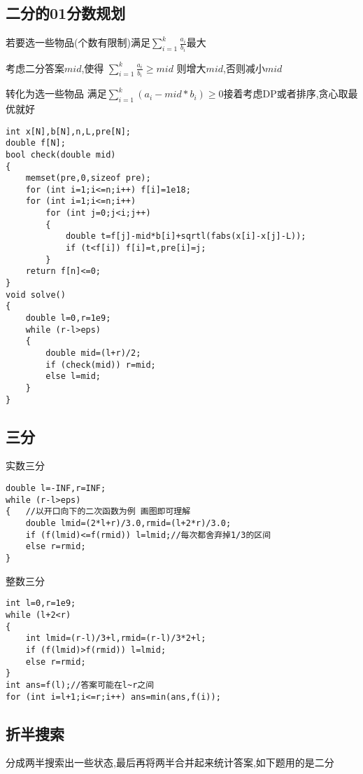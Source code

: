 \documentclass[a4paper]{ctexart}
\begin{document}
\subsection{二分的01分数规划}

若要选一些物品(个数有限制)满足$\sum\limits_{i=1}^k\frac{a_i}{b_i}$最大

考虑二分答案$mid$,使得 $\sum\limits_{i=1}^k\frac{a_i}{b_i}\ge mid$ 则增大$mid$,否则减小$mid$

转化为选一些物品 满足$\sum\limits_{i=1}^k(a_i-mid*b_i)\ge0$接着考虑DP或者排序,贪心取最优就好

\begin{lstlisting}
int x[N],b[N],n,L,pre[N];
double f[N];
bool check(double mid)
{
    memset(pre,0,sizeof pre);
    for (int i=1;i<=n;i++) f[i]=1e18;
    for (int i=1;i<=n;i++)
        for (int j=0;j<i;j++)
        {
            double t=f[j]-mid*b[i]+sqrtl(fabs(x[i]-x[j]-L));
            if (t<f[i]) f[i]=t,pre[i]=j;
        }
    return f[n]<=0;
}
void solve()
{
    double l=0,r=1e9;
    while (r-l>eps)
    {
        double mid=(l+r)/2;
        if (check(mid)) r=mid;
        else l=mid;
    }
}
\end{lstlisting}

\subsection{三分}

实数三分

\begin{lstlisting}
double l=-INF,r=INF;
while (r-l>eps)
{   //以开口向下的二次函数为例 画图即可理解
    double lmid=(2*l+r)/3.0,rmid=(l+2*r)/3.0;
    if (f(lmid)<=f(rmid)) l=lmid;//每次都舍弃掉1/3的区间
    else r=rmid;
}
\end{lstlisting}

整数三分

\begin{lstlisting}
int l=0,r=1e9;
while (l+2<r)
{
    int lmid=(r-l)/3+l,rmid=(r-l)/3*2+l;
    if (f(lmid)>f(rmid)) l=lmid;
    else r=rmid;
}
int ans=f(l);//答案可能在l~r之间
for (int i=l+1;i<=r;i++) ans=min(ans,f(i));
\end{lstlisting}

\subsection{折半搜索}

分成两半搜索出一些状态,最后再将两半合并起来统计答案,如下题用的是二分
\end{document}
